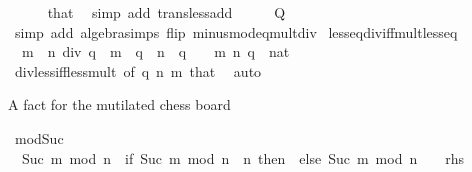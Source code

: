 \begin{isabellebody}
\ \ \ \ \isamarkupfalse%
\ that\ \isamarkupfalse%
\ {\isacharparenleft}{\kern0pt}simp\ add{\isacharcolon}{\kern0pt}\ trans{\isacharunderscore}{\kern0pt}less{\isacharunderscore}{\kern0pt}add{}{\isacharparenright}{\kern0pt}\isanewline
\ \ \isamarkupfalse%
\ \isamarkupfalse%
\ {\isacharquery}{\kern0pt}Q\isanewline
\ \ \ \ \isamarkupfalse%
\ {\isacharparenleft}{\kern0pt}simp\ add{\isacharcolon}{\kern0pt}\ algebra{\isacharunderscore}{\kern0pt}simps\ flip{\isacharcolon}{\kern0pt}\ minus{\isacharunderscore}{\kern0pt}mod{\isacharunderscore}{\kern0pt}eq{\isacharunderscore}{\kern0pt}mult{\isacharunderscore}{\kern0pt}div{\isacharparenright}{\kern0pt}\isanewline
{}\isamarkupfalse%
%
\endisatagproof
{\isafoldproof}%
%
\isadelimproof
\isanewline
%
\endisadelimproof
\isanewline
{}\isamarkupfalse%
\ less{\isacharunderscore}{\kern0pt}eq{\isacharunderscore}{\kern0pt}div{\isacharunderscore}{\kern0pt}iff{\isacharunderscore}{\kern0pt}mult{\isacharunderscore}{\kern0pt}less{\isacharunderscore}{\kern0pt}eq{\isacharcolon}{\kern0pt}\isanewline
\ \ {\isacartoucheopen}m\ {\isasymle}\ n\ div\ q\ {\isasymlongleftrightarrow}\ m\ {\isacharasterisk}{\kern0pt}\ q\ {\isasymle}\ n{\isacartoucheclose}\ \ {\isacartoucheopen}q\ {\isachargreater}{\kern0pt}\ {}{\isacartoucheclose}\ \ m\ n\ q\ {\isacharcolon}{\kern0pt}{\isacharcolon}{\kern0pt}\ nat\isanewline
%
\isadelimproof
\ \ %
\endisadelimproof
%
\isatagproof
{}\isamarkupfalse%
\ div{\isacharunderscore}{\kern0pt}less{\isacharunderscore}{\kern0pt}iff{\isacharunderscore}{\kern0pt}less{\isacharunderscore}{\kern0pt}mult\ {\isacharbrackleft}{\kern0pt}of\ q\ n\ m{\isacharbrackright}{\kern0pt}\ that\ \isamarkupfalse%
\ auto%
\endisatagproof
{\isafoldproof}%
%
\isadelimproof
%
\endisadelimproof
%
\begin{isamarkuptext}%
A fact for the mutilated chess board%
\end{isamarkuptext}\isamarkuptrue%
\isamarkupfalse%
\ mod{\isacharunderscore}{\kern0pt}Suc{\isacharcolon}{\kern0pt}\isanewline
\ \ {\isachardoublequoteopen}Suc\ m\ mod\ n\ {\isacharequal}{\kern0pt}\ {\isacharparenleft}{\kern0pt}if\ Suc\ {\isacharparenleft}{\kern0pt}m\ mod\ n{\isacharparenright}{\kern0pt}\ {\isacharequal}{\kern0pt}\ n\ then\ {}\ else\ Suc\ {\isacharparenleft}{\kern0pt}m\ mod\ n{\isacharparenright}{\kern0pt}{\isacharparenright}{\kern0pt}{\isachardoublequoteclose}\ {\isacharparenleft}{\kern0pt}\ {\isachardoublequoteopen}{\isacharunderscore}{\kern0pt}\ {\isacharequal}{\kern0pt}\ {\isacharquery}{\kern0pt}rhs{\isachardoublequoteclose}{\isacharparenright}{\kern0pt}\isanewline

\end{isabellebody}
